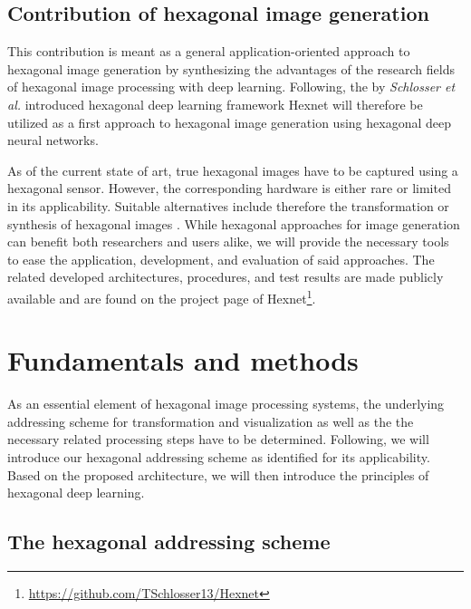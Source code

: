 \documentclass{article}
\begin{document}
\subsection{Contribution of hexagonal image generation}

This contribution is meant as a general application-oriented approach to hexagonal image generation by synthesizing the advantages of the research fields of hexagonal image processing with deep learning. Following, the by \textit{Schlosser et al.} \cite{Schlosser2019} introduced hexagonal deep learning framework Hexnet will therefore be utilized as a first approach to hexagonal image generation using hexagonal deep neural networks.

As of the current state of art, true hexagonal images have to be captured using a hexagonal sensor. However, the corresponding hardware is either rare or limited in its applicability. Suitable alternatives include therefore the transformation or synthesis of hexagonal images \cite{Steppa2019}. While hexagonal approaches for image generation can benefit both researchers and users alike, we will provide the necessary tools to ease the application, development, and evaluation of said approaches. The related developed architectures, procedures, and test results are made publicly available and are found on the project page of Hexnet\footnote{\url{https://github.com/TSchlosser13/Hexnet}}.


\section{Fundamentals and methods}

As an essential element of hexagonal image processing systems, the underlying addressing scheme for transformation and visualization as well as the the necessary related processing steps have to be determined. Following, we will introduce our hexagonal addressing scheme as identified for its applicability. Based on the proposed architecture, we will then introduce the principles of hexagonal deep learning.


\subsection{The hexagonal addressing scheme}
\end{document}
